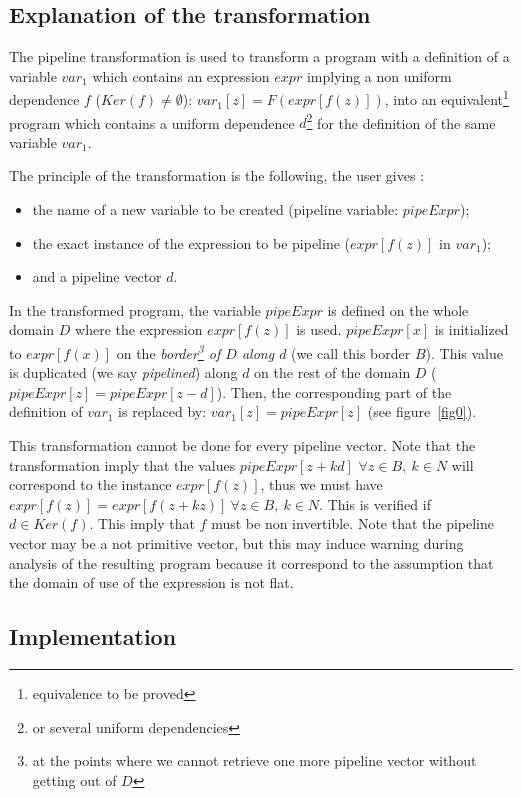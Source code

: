 \documentclass[a4paper,11pt]{article}
\begin{document}
\subsection{Explanation of the transformation}
The pipeline transformation is used to transform a program with 
a definition of a variable $var_1$ which contains an
expression $expr$ implying a non uniform dependence $f$ ($Ker(f) \neq
\emptyset$): $var_1[z] = F(expr[f(z)])$,  into an 
equivalent\footnote{equivalence to be proved} program which contains a uniform
dependence $d$\footnote{or several uniform dependencies} for the
definition of the same variable $var_1$.


The principle of the transformation is the following, 
the user gives : 
\begin{itemize}
\item the name of a new variable to be created 
 (pipeline variable: $pipeExpr$);
\item  the exact instance of 
the expression to be pipeline 
($expr[f(z)]$ in  $var_1$);
\item  and a pipeline vector
$d$. 
\end{itemize}
In the transformed program, 
the variable  $pipeExpr$ is defined on the whole domain $D$ where 
the expression $expr[f(z)]$ is used.
 $pipeExpr[x]$ is initialized to  $expr[f(x)]$ on the 
{\em border\footnote{at the points where we cannot retrieve one more pipeline vector without getting out of $D$} of $D$
 along $d$} (we call this border $B$).
 This value is  duplicated (we say {\em pipelined})
along $d$ on the rest of the domain $D$
($pipeExpr[z] = pipeExpr[z-d]$). Then, the corresponding part 
of the definition of $var_1$ is replaced by: 
$var_1[z] = pipeExpr[z]$ (see figure~\ref{fig0}).

This transformation cannot be done for every pipeline vector.
Note that  the transformation imply that the values
$pipeExpr[z+kd]$ $ \forall z \in B,\ k \in N$ will correspond to the
instance $expr[f(z)]$, thus we must have $expr[f(z)]=expr[f(z+kz)] \
\forall z \in B, \ k \in N$. This is verified if $d \in Ker(f)$. This 
imply that $f$ must be non invertible. Note that the pipeline vector 
may be a not primitive vector, but this may induce warning during 
analysis of the resulting program because it correspond to 
the assumption that the domain of use of the expression is not flat.


\subsection{Implementation}
\end{document}

